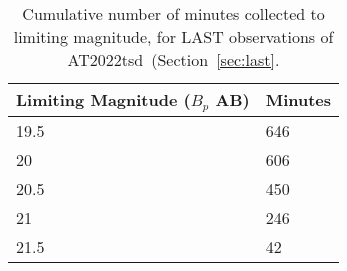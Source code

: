 \documentclass{nature_plusfigure}
\newcommand{\at}{AT2022tsd}
\begin{document}
\begin{supplement}
\begin{table}
    \centering
    \begin{tabular}{ll}
    \hline \hline
 Limiting Magnitude ($B_p$ AB) & Minutes \\
    \hline
         19.5    &      646\\
           20    &      606\\
         20.5    &      450\\
           21     &     246\\
         21.5     &      42   \\
         \hline
   \end{tabular}
\caption{Cumulative number of minutes collected to limiting magnitude, for LAST observations of \at\ (Section~\ref{sec:last}.}
\label{tab:last-maglim}
\end{table}

\clearpage


\end{supplement}
\end{document}
